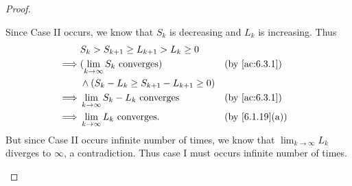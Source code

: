 \begin{proof}
\begin{itemize}
		      Since Case II occurs, we know that \(S_k\) is decreasing and \(L_k\) is increasing.
		      Thus
		      \begin{align*}
			               & S_k > S_{k + 1} \geq L_{k + 1} > L_k \geq 0                                           \\
			      \implies & (\lim_{k \to \infty} S_k \text{ converges})         &  & \by{ac:6.3.1}                \\
			               & \land (S_k - L_k \geq S_{k + 1} - L_{k + 1} \geq 0)                                   \\
			      \implies & \lim_{k \to \infty} S_k - L_k \text{ converges}     &  & \by{ac:6.3.1}                \\
			      \implies & \lim_{k \to \infty} L_k \text{ converges}.          &  & \text{(by \cref{6.1.19}(a))}
		      \end{align*}
		      But since Case II occurs infinite number of times, we know that \(\lim_{k \to \infty} L_k\) diverges to \(\infty\), a contradiction.
		      Thus case I must occurs infinite number of times.


\end{itemize}
\end{proof}
